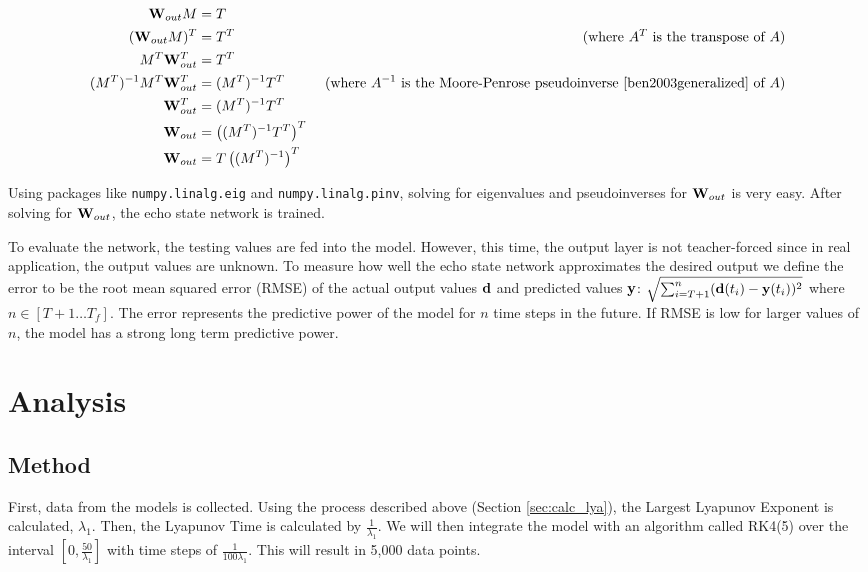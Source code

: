 \documentclass{article}
\begin{document}
\begin{align*}
    \mathbf{W}_{out} M &= T \\
    (\mathbf{W}_{out} M)^T &= T^T & \text{ (where $A^T$ is the transpose of $A$)} \\
    M^T \mathbf{W}_{out}^T &= T^T \\
    (M^T)^{-1} M^T \mathbf{W}_{out}^T &= (M^T)^{-1} T^T & \text{ (where $A^{-1}$ is the Moore-Penrose pseudoinverse \cite{ben2003generalized} of $A$)} \\
    \mathbf{W}_{out}^T &= (M^T)^{-1} T^T \\
    \mathbf{W}_{out} &= \left((M^T)^{-1} T^T\right)^T \\
    \mathbf{W}_{out} &= T \left((M^T)^{-1}\right)^T
\end{align*}

Using packages like \texttt{numpy.linalg.eig} and 
\texttt{numpy.linalg.pinv}, solving for eigenvalues and
pseudoinverses for $\mathbf{W}_{out}$ is very 
easy. After solving for $\mathbf{W}_{out}$, the echo state network is trained.

To evaluate the network, the testing values are fed into the model. 
However, this time, the output layer is not teacher-forced since 
in real application, the output values are unknown. 
To measure how well the echo state network approximates the desired output
we define the error to be the root mean squared error (RMSE) of the
actual output values $\mathbf{d}$ and
predicted values $\mathbf{y}$: $\sqrt{\sum_{i=T+1}^{n} (\mathbf{d}(t_i) - \mathbf{y}(t_i))^2}$ 
where $n \in [T+1 \dots T_f]$. The error represents the predictive power
of the model for $n$ time steps in the future. If RMSE is low for larger 
values of $n$, the model has a strong long term predictive power.



\section{Analysis}

\subsection{Method}

First, data from the models is collected. Using the process described
above (Section \ref{sec:calc_lya}), the Largest Lyapunov Exponent is
calculated, $\lambda_1$. Then, the Lyapunov Time is calculated by
$\frac{1}{\lambda_1}$. We will then integrate the model with an algorithm
called RK4(5) over the interval
$[0, \frac{50}{\lambda_1}]$ with time steps of $\frac{1}{100 \lambda_1}$. 
This will result in 5,000 data points.
\end{document}
